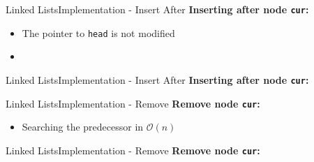 
\begin{frame}[fragile]{Linked Lists}{Implementation - Insert After}
  \textbf{Inserting after node \texttt{cur}:}
  \begin{itemize}
    \item
      The pointer to \texttt{head} is not modified
    \item
      
  \end{itemize}
\end{frame}


\begin{frame}{Linked Lists}{Implementation - Insert After}
  \textbf{Inserting after node \texttt{cur}:}
  \begin{flushleft}
    
  \end{flushleft}
\end{frame}


\begin{frame}[fragile]{Linked Lists}{Implementation - Remove}
  \textbf{Remove node \texttt{cur}:}
  \begin{itemize}
    \item
      Searching the predecessor in $\mathcal{O}(n)$
      
  \end{itemize}
\end{frame}


\begin{frame}{Linked Lists}{Implementation - Remove}
  \textbf{Remove node \texttt{cur}:}
  \begin{flushleft}
    
  \end{flushleft}
\end{frame}

